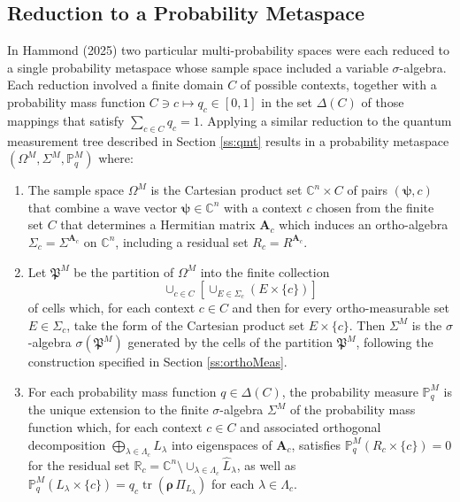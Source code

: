 \documentclass[11pt]{article}
\newcommand \R { \mathbb{R} }
\newcommand \C { \mathbb{C} }
\DeclareMathOperator{\tr}{tr}
\begin{document}
\subsection{Reduction to a Probability Metaspace}

In Hammond (2025) two particular multi-probability spaces were each reduced 
to a single probability metaspace whose sample space included a variable $ \sigma $-algebra.
Each reduction involved a finite domain $C$ of possible contexts, 
together with a probability mass function $C \owns c \mapsto q_c \in [0, 1] $
in the set $ \Delta (C) $ of those mappings that satisfy $ \sum _{c \in C} q_c = 1$.
Applying a similar reduction to the quantum measurement tree described in Section \ref{ss:qmt}
results in a probability metaspace $( \Omega ^M, \Sigma ^M, \mathbb P^M_q )$ where:
\begin{enumerate}
	\item The sample space $ \Omega ^M $ 
	is the Cartesian product set $ \C^n \times C$ of pairs $( \boldsymbol \psi, c)$ 
	that combine a wave vector $ \boldsymbol \psi \in \C^n $
	with a context $c$ chosen from the finite set $C$ 
	that determines a Hermitian matrix $ \mathbf A_c $ 
	which induces an ortho-algebra $ \Sigma _c = \Sigma ^{ \mathbf A_c }$ on $ \C^n $,
	including a residual set $ R_c = R ^{ \mathbf A_c }$.
%
	\item Let $ \mathfrak P^M $ be the partition of $ \Omega ^M $ into the finite collection
\begin{equation} \label{eq:partitionM}
	\cup _{c \in C} \left[ \cup _{E \in \Sigma _c } (E \times \{c\} ) \right]
\end{equation}
 	of cells which, for each context $c \in C$ 
	and then for every ortho-measurable set $E \in \Sigma _c $, 
	take the form of the Cartesian product set $E \times \{c\} $. 
	Then $ \Sigma ^M $ is the $ \sigma $-algebra $ \sigma ( \mathfrak P^M )$ 
	generated by the cells of the partition $ \mathfrak P^M $, 
	following the construction specified in Section \ref{ss:orthoMeas}.
%
	\item For each probability mass function $q \in \Delta (C) $, 
	the probability measure $ \mathbb P^M_q $ is the unique extension 
	to the finite $ \sigma $-algebra $ \Sigma ^M $ of the probability mass function which, 
	for each context $c \in C$ 
	and associated orthogonal decomposition $ \bigoplus _{ \lambda \in \Lambda _c } L_\lambda $
	into eigenspaces of $ \mathbf A_c $, satisfies $ \mathbb P^M_q ( R_c \times \{c\} ) = 0$ 
	for the residual set $ \R_c = \C^n \setminus \cup _{ \lambda \in \Lambda _c } \hat L_\lambda $,
	as well as 
 \( \mathbb P^M_q ( L_\lambda \times \{c\} ) = q_c \tr ( \boldsymbol \rho \, \Pi _{ L_\lambda }) \)
	for each $ \lambda \in \Lambda _c $.
\end{enumerate}
\end{document}
